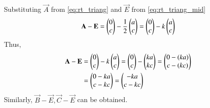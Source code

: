 \documentclass[journal,12pt,twocolumn]{IEEEtran}
\renewcommand\thesection{\arabic{section}}
\begin{document}
\begin{enumerate}[label=\thesection.\arabic*
,ref=\thesection.\theenumi]
%
\solution Substituting $\vec{A}$ from \eqref{eq:rt_triang} and $\vec{E}$ from \eqref{eq:rt_triang_mid}
\begin{align}
\label{eq:rt_triang_circum_coord_sol}
\mathbf{A}-\mathbf{E}= \begin{pmatrix}0 \\ c\end{pmatrix} - \frac{1}{2}\begin{pmatrix}a \\ c\end{pmatrix} = \begin{pmatrix}0 \\ c\end{pmatrix} - k\begin{pmatrix}a \\ c\end{pmatrix}
\end{align}
Thus, 
\begin{align}
\mathbf{A}-\mathbf{E}&=  \begin{pmatrix}0 \\ c\end{pmatrix} - k\begin{pmatrix}a \\ c\end{pmatrix} =  \begin{pmatrix}0 \\ c\end{pmatrix} - \begin{pmatrix}ka \\ kc\end{pmatrix}  =  \begin{pmatrix}0-(ka) \\ c - (kc)\end{pmatrix} 
\nonumber \\
& =  \begin{pmatrix}0-ka \\ c - kc\end{pmatrix} = \begin{pmatrix}-ka \\ c-kc\end{pmatrix} 
\end{align}
Similarly,
$\vec{B}-\vec{E}, 
\vec{C}-\vec{E}$ 
%
can be obtained.

\end{enumerate}
\end{document}
